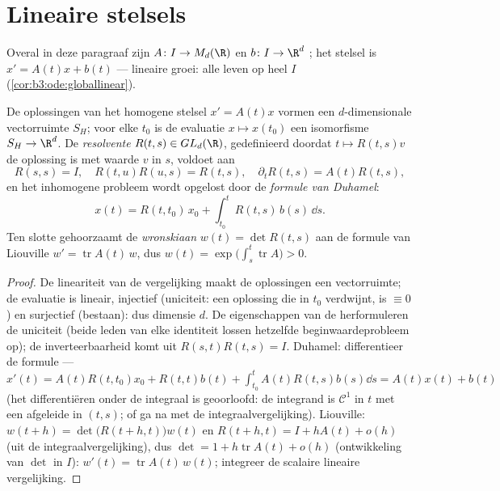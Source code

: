 \section{Lineaire stelsels}

Overal in deze paragraaf zijn $A \colon I \to M_d(\R)$ en $b
\colon I \to \R^d$ ; het stelsel is $x' = A(t)x + b(t)$
--- lineaire groei: alle  leven op heel $I$
(\cref{cor:b3:ode:globallinear}).

\begin{theorem}[Structuur]\label{thm:b3:ode:linearstructure}
De oplossingen van het homogene stelsel $x' = A(t)x$ vormen een
$d$-dimensionale vectorruimte $S_H$; voor elke $t_0$ is de
evaluatie $x \mapsto x(t_0)$ een isomorfisme $S_H \to \R^d$. De
\emph{resolvente} $R(t,
s) \in GL_d(\R)$, gedefinieerd doordat $t \mapsto R(t, s)v$ de
oplossing is met waarde $v$ in $s$, voldoet aan
\[
R(s,s) = I,\quad R(t, u)R(u, s) = R(t, s),\quad
\partial_tR(t,s) = A(t)R(t,s),
\]
en het inhomogene probleem wordt opgelost door de \emph{formule
van Duhamel}:
\[
x(t) = R(t, t_0)\,x_0 + \int_{t_0}^{t}R(t, s)\,b(s)\,\dd s .
\]
Ten slotte gehoorzaamt de \emph{wronskiaan}
$w(t) = \det R(t, s)$ aan de formule van Liouville $w' =
\operatorname{tr}A(t)\,w$, dus $w(t) =
\exp\bigl(\int_s^t\operatorname{tr}A\bigr) > 0$.
\end{theorem}

\begin{proof}
De lineariteit van de vergelijking maakt de oplossingen een
vectorruimte; de evaluatie is lineair, injectief (uniciteit: een
oplossing die in $t_0$ verdwijnt, is $\equiv 0$) en surjectief
(bestaan): dus dimensie $d$. De eigenschappen van de 
herformuleren de uniciteit (beide leden van elke identiteit
lossen hetzelfde beginwaardeprobleem op); de inverteerbaarheid
komt uit $R(s,t)R(t,s) = I$. Duhamel: differentieer de formule
--- $x'(t) = A(t)R(t,t_0)x_0 + R(t,t)b(t) +
\int_{t_0}^tA(t)R(t,s)b(s)\dd s = A(t)x(t) + b(t)$ (het
differentiëren onder de integraal is geoorloofd: de integrand is
$\mathcal C^1$ in $t$ met een  afgeleide in $(t,s)$; of
ga na met de integraalvergelijking). Liouville: $w(t + h) =
\det\bigl(R(t+h, t)\bigr)w(t)$ en $R(t + h, t) = I + hA(t) +
o(h)$ (uit de integraalvergelijking), dus $\det = 1 +
h\operatorname{tr}A(t) + o(h)$ (ontwikkeling van $\det$ in $I$):
$w'(t) = \operatorname{tr}A(t)\,w(t)$; integreer de scalaire
lineaire vergelijking.
\end{proof}

